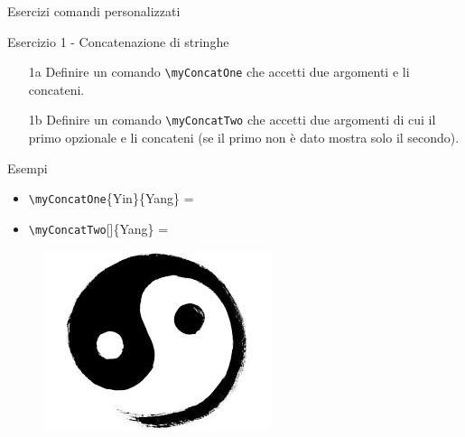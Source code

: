 \begin{frame}[fragile]{Esercizi comandi personalizzati}

\begin{block}{Esercizio 1 - Concatenazione di stringhe}
    
    \begin{itemize}
        \item [1a] Definire un comando \texttt{\textbackslash myConcatOne} che accetti due argomenti e li concateni.
        \item [1b] Definire un comando \texttt{\textbackslash myConcatTwo} che accetti due argomenti di cui il primo opzionale e li concateni (se il primo non è dato mostra solo il secondo).
    \end{itemize}

\end{block}

\begin{block}{Esempi}

    \begin{itemize}
        \item \texttt{\textbackslash myConcatOne}\{Yin\}\{Yang\} = 
        \item \texttt{\textbackslash myConcatTwo}[]\{Yang\} = 
    \end{itemize}

\end{block}

\begin{figure}[l]
    \includegraphics[scale=0.15, left]{res/images/yinyang.jpg}
\end{figure}


\end{frame}
